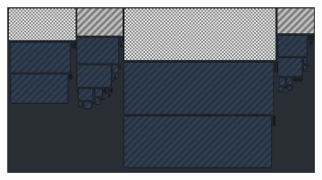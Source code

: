\begin{figure}[H]
    \centering
    \begin{subfigure}[t]{0.75\textwidth}
        \includegraphics[height = 0.35\textheight, width=\textwidth ]{figures/profilingSlowCreateVariablesFlux.png}
        \caption{}
        \label{fig:profileSlowCreateVar}
    \end{subfigure}
    \hspace{0.06\textwidth}
    \begin{subfigure}[t]{0.18\textwidth}

\end{subfigure}
\end{figure}

